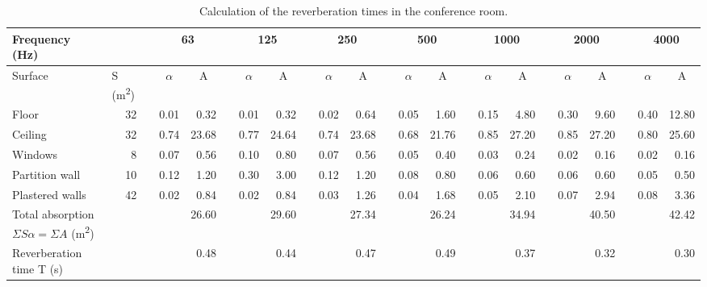 \begin{sidewaystable}[htbp]
	\caption{Calculation of the reverberation times in the conference room.}
	\label{tbl:reverb_conf}
	\centering
	\begin{tabular}{@{}b{3cm}rrrrrrrrrrrrrrrrrrrrrr@{}}
		\toprule
		Frequency (Hz) & \multicolumn{1}{l}{} & \multicolumn{1}{c}{} & \multicolumn{2}{c}{63} & \multicolumn{1}{c}{} & \multicolumn{2}{c}{125} & \multicolumn{1}{c}{} & \multicolumn{2}{c}{250} & \multicolumn{1}{c}{} & \multicolumn{2}{c}{500} & \multicolumn{1}{c}{} & \multicolumn{2}{c}{1000} & \multicolumn{1}{c}{} & \multicolumn{2}{c}{2000} & \multicolumn{1}{c}{} & \multicolumn{2}{c}{4000} \\ \midrule
		Surface & \multicolumn{1}{l}{S (m\textsuperscript{2})} & \multicolumn{1}{l}{} & \multicolumn{1}{c}{$\alpha$} & \multicolumn{1}{c}{A} & \multicolumn{1}{c}{} & \multicolumn{1}{c}{$\alpha$} & \multicolumn{1}{c}{A} & \multicolumn{1}{c}{} & \multicolumn{1}{c}{$\alpha$} & \multicolumn{1}{c}{A} & \multicolumn{1}{c}{} & \multicolumn{1}{c}{$\alpha$} & \multicolumn{1}{c}{A} & \multicolumn{1}{c}{} & \multicolumn{1}{c}{$\alpha$} & \multicolumn{1}{c}{A} & \multicolumn{1}{c}{} & \multicolumn{1}{c}{$\alpha$} & \multicolumn{1}{c}{A} & \multicolumn{1}{c}{} & \multicolumn{1}{c}{$\alpha$} & \multicolumn{1}{c}{A} \\
		Floor & 32 &  & 0.01 & 0.32 &  & 0.01 & 0.32 &  & 0.02 & 0.64 &  & 0.05 & 1.60 &  & 0.15 & 4.80 &  & 0.30 & 9.60 &  & 0.40 & 12.80 \\
		Ceiling & 32 &  & 0.74 & 23.68 &  & 0.77 & 24.64 &  & 0.74 & 23.68 &  & 0.68 & 21.76 &  & 0.85 & 27.20 &  & 0.85 & 27.20 &  & 0.80 & 25.60 \\
		Windows & 8 &  & 0.07 & 0.56 &  & 0.10 & 0.80 &  & 0.07 & 0.56 &  & 0.05 & 0.40 &  & 0.03 & 0.24 &  & 0.02 & 0.16 &  & 0.02 & 0.16 \\
		Partition wall & 10 &  & 0.12 & 1.20 &  & 0.30 & 3.00 &  & 0.12 & 1.20 &  & 0.08 & 0.80 &  & 0.06 & 0.60 &  & 0.06 & 0.60 &  & 0.05 & 0.50 \\
		Plastered walls & 42 &  & 0.02 & 0.84 &  & 0.02 & 0.84 &  & 0.03 & 1.26 &  & 0.04 & 1.68 &  & 0.05 & 2.10 &  & 0.07 & 2.94 &  & 0.08 & 3.36 \\ \midrule
		Total absorption $\Sigma S \alpha = \Sigma A$ (m\textsuperscript{2}) &  &  &  & 26.60 &  &  & 29.60 &  &  & 27.34 &  &  & 26.24 &  &  & 34.94 &  &  & 40.50 &  &  & 42.42 \\
		Reverberation time T (s) &  &  &  & 0.48 &  &  & 0.44 &  &  & 0.47 &  &  & 0.49 &  &  & 0.37 &  &  & 0.32 &  &  & 0.30 \\ \bottomrule
	\end{tabular}
\end{sidewaystable}